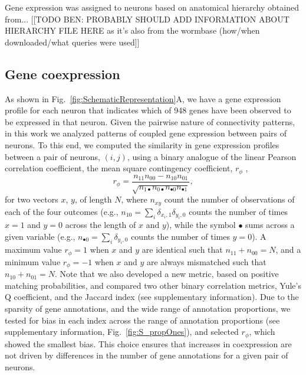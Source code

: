 \documentclass[10pt,letterpaper]{article}
\begin{document}
Gene expression was assigned to neurons based on anatomical hierarchy obtained from...
[[TODO BEN: PROBABLY SHOULD ADD INFORMATION ABOUT HIERARCHY FILE HERE as it's also from the wormbase (how/when downloaded/what queries were used]]

\subsection*{Gene coexpression}
As shown in Fig.~\ref{fig:SchematicRepresentation}A, we have a gene expression profile for each neuron that indicates which of 948 genes have been observed to be expressed in that neuron.
Given the pairwise nature of connectivity patterns, in this work we analyzed patterns of coupled gene expression between pairs of neurons.
To this end, we computed the similarity in gene expression profiles between a pair of neurons, $(i,j)$, using a binary analogue of the linear Pearson correlation coefficient, the mean square contingency coefficient, $r_\phi$ \cite{Warrens2008},
\begin{equation}
    r_\phi = \frac{n_{11}n_{00} - n_{10}n_{01}}{\sqrt{n_{1\bullet}n_{0\bullet}n_{\bullet 0}n_{\bullet 1}}},
\end{equation}
for two vectors $x$, $y$, of length $N$, where $n_{xy}$ count the number of observations of each of the four outcomes (e.g., $n_{10} = \sum_i \delta_{x_i,1}\delta_{y_i,0}$ counts the number of times $x=1$ and $y=0$ across the length of $x$ and $y$), while the symbol $\bullet$ sums across a given variable (e.g., $n_{\bullet 0} = \sum_i \delta_{y_i,0}$ counts the number of times $y = 0$).
A maximum value $r_\phi = 1$ when $x$ and $y$ are identical such that $n_{11} + n_{00} = N$, and a minimum value $r_\phi = -1$ when $x$ and $y$ are always mismatched such that $n_{10} + n_{01} = N$.
Note that we also developed a new metric, based on positive matching probabilities, and compared two other binary correlation metrics, Yule's Q coefficient, and the Jaccard index (see supplementary information).
Due to the sparsity of gene annotations, and the wide range of annotation proportions, we tested for bias in each index across the range of annotation proportions (see supplementary information, Fig.~\ref{fig:S_propOnes}), and selected $r_\phi$, which showed the smallest bias.
This choice ensures that increases in coexpression are not driven by differences in the number of gene annotations for a given pair of neurons.
\end{document}
